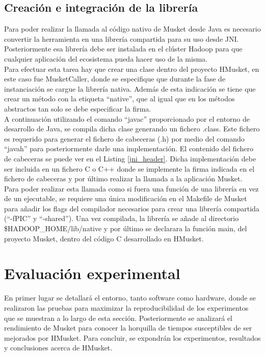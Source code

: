 \documentclass[conference]{IEEEtran}
\begin{document}
\subsection{Creación e integración de la librería}
Para poder realizar la llamada al código nativo de Musket desde Java es necesario convertir la herramienta en una librería compartida para su uso desde JNI. Posteriormente esa librería debe ser instalada en el clúster Hadoop para que cualquier aplicación del ecosistema pueda hacer uso de la misma.\\
Para efectuar esta tarea hay que crear una clase dentro del proyecto HMusket, en este caso fue MusketCaller, donde se especifique que durante la fase de instanciación se cargue la librería nativa. Además de esta indicación se tiene que crear un método con la etiqueta ``native'', que al igual que en los métodos abstractos tan solo se debe especificar la firma.\\
A continuación utilizando el comando ``javac'' proporcionado por el entorno de desarrollo de Java, se compila dicha clase generando un fichero .class. Este fichero es requerido para generar el fichero de cabeceras (.h) por medio del comando ``javah'' para posteriormente darle una implementación. El contenido del fichero de cabeceras se puede ver en el Listing \ref{jni_header}. Dicha implementación debe ser incluida en un fichero C o C++ donde se implemente la firma indicada en el fichero de cabeceras y por último realizar la llamada a la aplicación Musket.\\
Para poder realizar esta llamada como si fuera una función de una librería en vez de un ejecutable, se requiere una única modificación en el Makefile de Musket para añadir los flags del compilador necesarios para crear una librería compartida (``-fPIC'' y ``-shared''). Una vez compilada, la librería se añade al directorio \$HADOOP\_HOME/lib/native y por último se declarara la función main, del proyecto Musket, dentro del código C desarrollado en HMusket.

\section{Evaluación experimental}
En primer lugar se detallará el entorno, tanto software como hardware, donde se realizaron las pruebas para maximizar la reproducibilidad de los experimentos que se muestran a lo largo de esta sección. Posteriormente se analizará el rendimiento de Musket para conocer la horquilla de tiempos susceptibles de ser mejorados por HMusket. Para concluir, se expondrán los experimentos, resultados y conclusiones acerca de HMusket.
\end{document}

